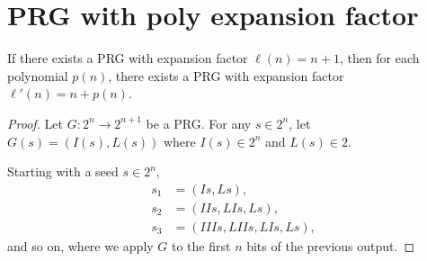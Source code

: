 \section{PRG with poly expansion factor} \label{sec:prg-poly-exp}
\begin{theorem}
    If there exists a PRG with expansion factor $\ell(n) = n + 1$, then for
    each polynomial $p(n)$, there exists a PRG with expansion factor
    $\ell'(n) = n + p(n)$.
\end{theorem}
\begin{proof}
    Let $G\colon 2^n \to 2^{n+1}$ be a PRG.
    For any $s \in 2^n$, let $G(s) = (I(s), L(s))$ where
    $I(s) \in 2^n$ and $L(s) \in 2$.

    Starting with a seed $s \in 2^n$, \begin{align*}
        s_1 &= (Is, Ls), \\
        s_2 &= (IIs, LIs, Ls), \\
        s_3 &= (IIIs, LIIs, LIs, Ls),
    \end{align*} and so on,
    where we apply $G$ to the first $n$ bits of the previous output.
\end{proof}
